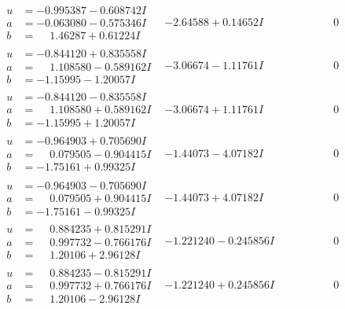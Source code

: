 \documentclass[1p]{elsarticle_modified}
\theoremstyle{definition}
\begin{document}
$$\begin{array}{c|c|c}
\begin{aligned}
u &= -0.995387 - 0.608742 I \\
a &= -0.063080 - 0.575346 I \\
b &= \phantom{-}1.46287 + 0.61224 I\end{aligned}
 & -2.64588 + 0.14652 I & \phantom{-0.000000 } 0 \\ \hline\begin{aligned}
u &= -0.844120 + 0.835558 I \\
a &= \phantom{-}1.108580 - 0.589162 I \\
b &= -1.15995 - 1.20057 I\end{aligned}
 & -3.06674 - 1.11761 I & \phantom{-0.000000 } 0 \\ \hline\begin{aligned}
u &= -0.844120 - 0.835558 I \\
a &= \phantom{-}1.108580 + 0.589162 I \\
b &= -1.15995 + 1.20057 I\end{aligned}
 & -3.06674 + 1.11761 I & \phantom{-0.000000 } 0 \\ \hline\begin{aligned}
u &= -0.964903 + 0.705690 I \\
a &= \phantom{-}0.079505 - 0.904415 I \\
b &= -1.75161 + 0.99325 I\end{aligned}
 & -1.44073 - 4.07182 I & \phantom{-0.000000 } 0 \\ \hline\begin{aligned}
u &= -0.964903 - 0.705690 I \\
a &= \phantom{-}0.079505 + 0.904415 I \\
b &= -1.75161 - 0.99325 I\end{aligned}
 & -1.44073 + 4.07182 I & \phantom{-0.000000 } 0 \\ \hline\begin{aligned}
u &= \phantom{-}0.884235 + 0.815291 I \\
a &= \phantom{-}0.997732 - 0.766176 I \\
b &= \phantom{-}1.20106 + 2.96128 I\end{aligned}
 & -1.221240 - 0.245856 I & \phantom{-0.000000 } 0 \\ \hline\begin{aligned}
u &= \phantom{-}0.884235 - 0.815291 I \\
a &= \phantom{-}0.997732 + 0.766176 I \\
b &= \phantom{-}1.20106 - 2.96128 I\end{aligned}
 & -1.221240 + 0.245856 I & \phantom{-0.000000 } 0 \\ \hline\begin{aligned}

\end{aligned}
\end{array}$$
\end{document}
